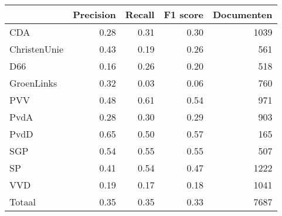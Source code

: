 \begin{tabular}{lrrrr}
\toprule
{} &  Precision &  Recall &  F1 score &  Documenten \\
\midrule
CDA          &       0.28 &    0.31 &      0.30 &        1039 \\
ChristenUnie &       0.43 &    0.19 &      0.26 &         561 \\
D66          &       0.16 &    0.26 &      0.20 &         518 \\
GroenLinks   &       0.32 &    0.03 &      0.06 &         760 \\
PVV          &       0.48 &    0.61 &      0.54 &         971 \\
PvdA         &       0.28 &    0.30 &      0.29 &         903 \\
PvdD         &       0.65 &    0.50 &      0.57 &         165 \\
SGP          &       0.54 &    0.55 &      0.55 &         507 \\
SP           &       0.41 &    0.54 &      0.47 &        1222 \\
VVD          &       0.19 &    0.17 &      0.18 &        1041 \\
Totaal       &       0.35 &    0.35 &      0.33 &        7687 \\
\bottomrule
\end{tabular}
